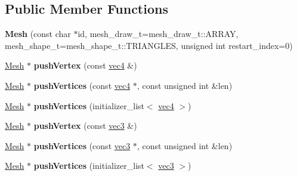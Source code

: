 \subsection*{Public Member Functions}
\begin{DoxyCompactItemize}
\item 
\hypertarget{classj3d_1_1Mesh_a50845e2441dd6a47535a46681b75a61b}{}{\bfseries Mesh} (const char $\ast$id, mesh\+\_\+draw\+\_\+t=mesh\+\_\+draw\+\_\+t\+::\+A\+R\+R\+A\+Y, mesh\+\_\+shape\+\_\+t=mesh\+\_\+shape\+\_\+t\+::\+T\+R\+I\+A\+N\+G\+L\+E\+S, unsigned int restart\+\_\+index=0)\label{classj3d_1_1Mesh_a50845e2441dd6a47535a46681b75a61b}

\item 
\hypertarget{classj3d_1_1Mesh_a0424c1252d3e0102509a1e711c10871a}{}\hyperlink{classj3d_1_1Mesh}{Mesh} $\ast$ {\bfseries push\+Vertex} (const \hyperlink{structj3d_1_1vec4}{vec4} \&)\label{classj3d_1_1Mesh_a0424c1252d3e0102509a1e711c10871a}

\item 
\hypertarget{classj3d_1_1Mesh_ad2706e1df7e487c98e92ced73b0a4868}{}\hyperlink{classj3d_1_1Mesh}{Mesh} $\ast$ {\bfseries push\+Vertices} (const \hyperlink{structj3d_1_1vec4}{vec4} $\ast$, const unsigned int \&len)\label{classj3d_1_1Mesh_ad2706e1df7e487c98e92ced73b0a4868}

\item 
\hypertarget{classj3d_1_1Mesh_aba0d1a333fbbe08088f5eeb7d215d4fe}{}\hyperlink{classj3d_1_1Mesh}{Mesh} $\ast$ {\bfseries push\+Vertices} (initializer\+\_\+list$<$ \hyperlink{structj3d_1_1vec4}{vec4} $>$)\label{classj3d_1_1Mesh_aba0d1a333fbbe08088f5eeb7d215d4fe}

\item 
\hypertarget{classj3d_1_1Mesh_a16c0372e4b7ef6c04e5b264d2713c764}{}\hyperlink{classj3d_1_1Mesh}{Mesh} $\ast$ {\bfseries push\+Vertex} (const \hyperlink{structj3d_1_1vec3}{vec3} \&)\label{classj3d_1_1Mesh_a16c0372e4b7ef6c04e5b264d2713c764}

\item 
\hypertarget{classj3d_1_1Mesh_ad7e82524f542ece78233996704b29249}{}\hyperlink{classj3d_1_1Mesh}{Mesh} $\ast$ {\bfseries push\+Vertices} (const \hyperlink{structj3d_1_1vec3}{vec3} $\ast$, const unsigned int \&len)\label{classj3d_1_1Mesh_ad7e82524f542ece78233996704b29249}

\item 
\hypertarget{classj3d_1_1Mesh_a653940f151ce28564b72eb3d835aa721}{}\hyperlink{classj3d_1_1Mesh}{Mesh} $\ast$ {\bfseries push\+Vertices} (initializer\+\_\+list$<$ \hyperlink{structj3d_1_1vec3}{vec3} $>$)\label{classj3d_1_1Mesh_a653940f151ce28564b72eb3d835aa721}


\end{DoxyCompactItemize}
